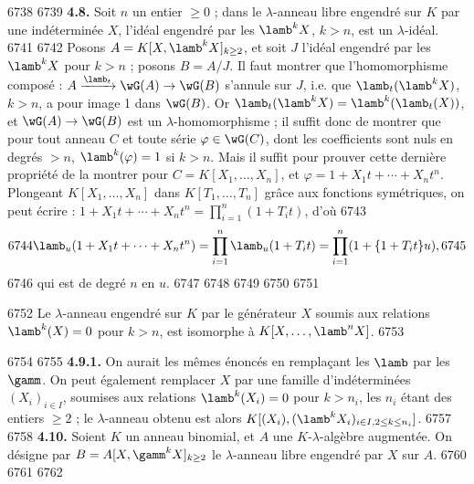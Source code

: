   6738	%
  6739		\noindent\textbf{4.8.} Soit $n$ un entier $\geq 0$ ; dans le $\lambda$-anneau libre engendr\'e sur $K$ par une ind\'etermin\'ee $X$, l'id\'eal engendr\'e par les $\lamb^k X$, $k > n$, est un $\lambda$-id\'eal.
  6741	
  6742	Posons $A = K[X, \lamb^k X]_{k \geq 2}$, et soit $J$ l'id\'eal engendr\'e par les $\lamb^k X$ pour $k > n$ ; posons $B = A/J$. Il faut montrer que l'homomorphisme compos\'e : $A \xrightarrow{\lamb_t} \wG(A) \to \wG(B)$ s'annule sur $J$, i.e. que $\lamb_t(\lamb^k X)$, $k > n$, a pour image 1 dans $\wG(B)$. Or $\lamb_t(\lamb^k X) = \lamb^k(\lamb_t(X))$, et $\wG(A) \to \wG(B)$ est un $\lambda$-homomorphisme ; il suffit donc de montrer que pour tout anneau $C$ et toute s\'erie $\varphi \in \wG(C)$, dont les coefficients sont nuls en degr\'es $> n$, $\lamb^k(\varphi) = 1$ si $k > n$. Mais il suffit pour prouver cette derni\`ere propri\'et\'e de la montrer pour $C = K[X_1, \ldots, X_n]$, et $\varphi = 1 + X_1 t + \cdots + X_n t^n$. Plongeant $K[X_1, \ldots, X_n]$ dans $K[T_1, \ldots, T_n]$ gr\^ace aux fonctions sym\'etriques, on peut \'ecrire : $1 + X_1 t + \cdots + X_n t^n = \prod_{i=1}^{n}(1 + T_i t)$, d'o\`u
  6743	\[
  6744	\lamb_u(1 + X_1 t + \cdots + X_n t^n) = \prod_{i=1}^{n} \lamb_u(1 + T_i t) = \prod_{i=1}^{n} (1 + \{1 + T_i t\} u),
  6745	\]
  6746	qui est de degr\'e $n$ en $u$.
  6747	
  6748	%
  6749	%
  6750	%
  6751	\begin{corollaire}
  6752	Le $\lambda$-anneau engendr\'e sur $K$ par le g\'en\'erateur $X$ soumis aux relations $\lamb^k(X) = 0$ pour $k > n$, est isomorphe \`a $K[X, \ldots, \lamb^n X]$.
  6753	\end{corollaire}
  6754	
  6755		\noindent\textbf{4.9.1.} On aurait les m\^emes \'enonc\'es en rempla\c cant les $\lamb$ par les $\gamm$. On peut \'egalement remplacer $X$ par une famille d'ind\'etermin\'ees $(X_i)_{i \in I}$, soumises aux relations $\lamb^k(X_i) = 0$ pour $k > n_i$, les $n_i$ \'etant des entiers $\geq 2$ ; le $\lambda$-anneau obtenu est alors $K[(X_i), (\lamb^k X_i)_{i \in I, 2 \leq k \leq n_i}]$.
  6757	
  6758		\noindent\textbf{4.10.} Soient $K$ un anneau binomial, et $A$ une $K$-$\lambda$-alg\`ebre augment\'ee. On d\'esigne par $B = A[X, \gamm^k X]_{k \geq 2}$ le $\lambda$-anneau libre engendr\'e par $X$ sur $A$.
  6760	
  6761	%
  6762	%
